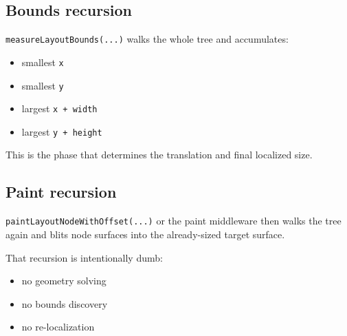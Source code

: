 \subsection{Bounds recursion}\label{record-049-bounds-recursion}

\texttt{m\allowbreak{}e\allowbreak{}a\allowbreak{}s\allowbreak{}u\allowbreak{}r\allowbreak{}e\allowbreak{}L\allowbreak{}a\allowbreak{}y\allowbreak{}o\allowbreak{}u\allowbreak{}t\allowbreak{}B\allowbreak{}o\allowbreak{}u\allowbreak{}n\allowbreak{}d\allowbreak{}s\allowbreak{}(\allowbreak{}.\allowbreak{}.\allowbreak{}.\allowbreak{})} walks the whole tree and accumulates:

\begin{itemize}
\tightlist
\item
  smallest \texttt{x}
\item
  smallest \texttt{y}
\item
  largest \texttt{x\allowbreak{} \allowbreak{}+\allowbreak{} \allowbreak{}w\allowbreak{}i\allowbreak{}d\allowbreak{}t\allowbreak{}h}
\item
  largest \texttt{y\allowbreak{} \allowbreak{}+\allowbreak{} \allowbreak{}h\allowbreak{}e\allowbreak{}i\allowbreak{}g\allowbreak{}h\allowbreak{}t}
\end{itemize}

This is the phase that determines the translation and final localized size.

\subsection{Paint recursion}\label{record-049-paint-recursion}

\texttt{p\allowbreak{}a\allowbreak{}i\allowbreak{}n\allowbreak{}t\allowbreak{}L\allowbreak{}a\allowbreak{}y\allowbreak{}o\allowbreak{}u\allowbreak{}t\allowbreak{}N\allowbreak{}o\allowbreak{}d\allowbreak{}e\allowbreak{}W\allowbreak{}i\allowbreak{}t\allowbreak{}h\allowbreak{}O\allowbreak{}f\allowbreak{}f\allowbreak{}s\allowbreak{}e\allowbreak{}t\allowbreak{}(\allowbreak{}.\allowbreak{}.\allowbreak{}.\allowbreak{})} or the paint middleware then walks the tree again and blits node surfaces into the already-sized target surface.

That recursion is intentionally dumb:

\begin{itemize}
\tightlist
\item
  no geometry solving
\item
  no bounds discovery
\item
  no re-localization
\end{itemize}

